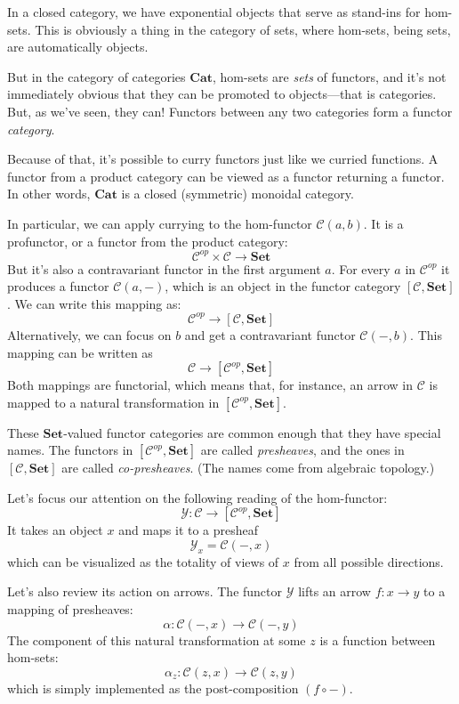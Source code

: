 \documentclass[DaoFP]{subfiles}
\begin{document}
In a closed category, we have exponential objects that serve as stand-ins for hom-sets. This is obviously a thing in the category of sets, where hom-sets, being sets, are automatically objects. 

But in the category of categories  $\mathbf{Cat}$, hom-sets are \emph{sets} of functors, and it's not immediately obvious that they can be promoted to objects---that is categories. But, as we've seen, they can! Functors between any two categories form a functor \emph{category}.

Because of that, it's possible to curry functors just like we curried functions. A functor from a product category can be viewed as a functor returning a functor. In other words, $\mathbf{Cat}$ is a closed (symmetric) monoidal category.

In particular, we can apply currying to the hom-functor $\mathcal{C}(a, b)$. It is a profunctor, or a functor from the product category:
\[ \mathcal{C}^{op} \times \mathcal{C} \to  \mathbf{Set} \]
But it's also a contravariant functor in the first argument $a$. For every $a$ in  $\mathcal{C}^{op}$  it produces a functor $\mathcal{C}(a, -)$, which is an object in the functor category $ [\mathcal{C},  \mathbf{Set}] $. We can write this mapping as:
\[ \mathcal{C}^{op} \to [\mathcal{C},  \mathbf{Set}] \]
Alternatively, we can focus on $b$ and get a contravariant functor $\mathcal{C}(-, b)$. This mapping can be written as
\[ \mathcal{C} \to [\mathcal{C}^{op},  \mathbf{Set}] \]
Both mappings are functorial, which means that, for instance, an arrow in $\mathcal{C}$ is mapped to a natural transformation in $[\mathcal{C}^{op},  \mathbf{Set}]$.

These $\mathbf{Set}$-valued functor categories are common enough that they have special names. The functors in $[\mathcal{C}^{op},  \mathbf{Set}]$ are called \emph{presheaves}, and the ones in $[\mathcal{C},  \mathbf{Set}]$ are called \emph{co-presheaves}. (The names come from algebraic topology.)

Let's focus our attention on the following reading of the hom-functor:
\[ \mathcal{Y} \colon \mathcal{C} \to [\mathcal{C}^{op},  \mathbf{Set}] \]
It takes an object $x$ and maps it to a presheaf 
\[ \mathcal Y_x = \mathcal{C}(-, x) \]
which can be visualized as the totality of views of $x$ from all possible directions.

Let's also review its action on arrows. The functor $\mathcal{Y}$ lifts an arrow $f \colon x \to y$ to a mapping of presheaves:
\[ \alpha \colon \mathcal{C}(-, x) \to \mathcal{C}(-, y) \]
The component of this natural transformation at some $z$ is a function between hom-sets:
\[ \alpha_z \colon \mathcal{C}(z, x) \to \mathcal{C}(z, y) \]
which is simply implemented as the post-composition $(f \circ -)$.
\end{document}
